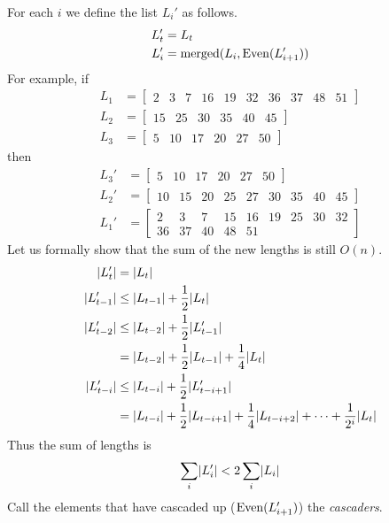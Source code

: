 \begin{solution}
    For each $i$ we define the list $L_i'$ as follows.
    \begin{align*}
        L_t' &= L_t \\
        L_i' &= \operatorname{merged}(L_i, \operatorname{Even}(L_{i+1}'))
    \end{align*}
    For example, if \begin{align*}
        L_1 &= \begin{bmatrix}
            2 & 3 & 7 & 16 & 19 & 32 & 36 & 37 & 48 & 51
        \end{bmatrix} \\
        L_2 &= \begin{bmatrix}
            15 & 25 & 30 & 35 & 40 & 45
        \end{bmatrix} \\
        L_3 &= \begin{bmatrix}
            5 & 10 & 17 & 20 & 27 & 50
        \end{bmatrix}
    \end{align*} then \begin{align*}
        L_3' &= \begin{bmatrix}
            5 & 10 & 17 & 20 & 27 & 50
        \end{bmatrix} \\
        L_2' &= \begin{bmatrix}
            10 & 15 & 20 & 25 & 27 & 30 & 35 & 40 & 45
        \end{bmatrix} \\
        L_1' &= \begin{bmatrix}
            2 & 3 & 7 & 15 & 16 & 19 & 25 & 30 & 32 \\ 36 & 37 & 40 & 48 & 51
        \end{bmatrix}
    \end{align*}
    Let us formally show that the sum of the new lengths is still $O(n)$.
    \begin{align*}
        \lvert L_t'\rvert &= \lvert L_t\rvert \\
        \lvert L_{t-1}'\rvert &\le \lvert L_{t-1}\rvert + \frac12 \lvert L_t\rvert \\
        \lvert L_{t-2}'\rvert &\le \lvert L_{t-2}\rvert + \frac12 \lvert L_{t-1}'\rvert \\
        &= \lvert L_{t-2}\rvert + \frac12 \lvert L_{t-1}\rvert + \frac14 \lvert L_t\rvert \\
        \lvert L_{t-i}'\rvert &\le \lvert L_{t-i}\rvert + \frac12 \lvert L_{t-i+1}'\rvert \\
        &= \lvert L_{t-i}\rvert + \frac12 \lvert L_{t-i+1}\rvert +
            \frac14 \lvert L_{t-i+2}\rvert + \dots + \frac{1}{2^i} \lvert L_t\rvert
    \end{align*}
    Thus the sum of lengths is \[
        \sum_i \lvert L_i'\rvert < 2 \sum_i \lvert L_i\rvert
    \]
    Call the elements that have cascaded up ($\operatorname{Even}(L_{i+1}')$) the
    \emph{cascaders}.


\end{solution}
